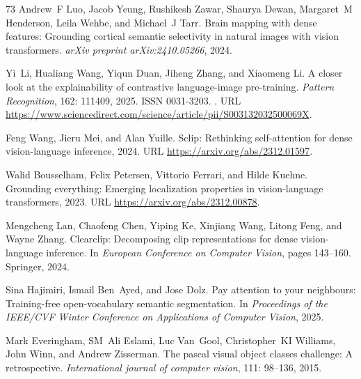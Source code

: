 \documentclass{article}
\begin{document}
\begin{thebibliography}{73}
Andrew~F Luo, Jacob Yeung, Rushikesh Zawar, Shaurya Dewan, Margaret~M
  Henderson, Leila Wehbe, and Michael~J Tarr.
\newblock Brain mapping with dense features: Grounding cortical semantic
  selectivity in natural images with vision transformers.
\newblock \emph{arXiv preprint arXiv:2410.05266}, 2024.

Yi~Li, Hualiang Wang, Yiqun Duan, Jiheng Zhang, and Xiaomeng Li.
\newblock A closer look at the explainability of contrastive language-image
  pre-training.
\newblock \emph{Pattern Recognition}, 162: 111409, 2025.
\newblock ISSN 0031-3203.
\newblock {}.
\newblock URL
  \url{https://www.sciencedirect.com/science/article/pii/S003132032500069X}.

Feng Wang, Jieru Mei, and Alan Yuille.
\newblock Sclip: Rethinking self-attention for dense vision-language inference,
  2024{}.
\newblock URL \url{https://arxiv.org/abs/2312.01597}.

Walid Bousselham, Felix Petersen, Vittorio Ferrari, and Hilde Kuehne.
\newblock Grounding everything: Emerging localization properties in
  vision-language transformers, 2023.
\newblock URL \url{https://arxiv.org/abs/2312.00878}.

Mengcheng Lan, Chaofeng Chen, Yiping Ke, Xinjiang Wang, Litong Feng, and Wayne
  Zhang.
\newblock Clearclip: Decomposing clip representations for dense vision-language
  inference.
\newblock In \emph{European Conference on Computer Vision}, pages 143--160.
  Springer, 2024.

Sina Hajimiri, Ismail Ben~Ayed, and Jose Dolz.
\newblock Pay attention to your neighbours: Training-free open-vocabulary
  semantic segmentation.
\newblock In \emph{Proceedings of the IEEE/CVF Winter Conference on
  Applications of Computer Vision}, 2025.

Mark Everingham, SM~Ali Eslami, Luc Van~Gool, Christopher~KI Williams, John
  Winn, and Andrew Zisserman.
\newblock The pascal visual object classes challenge: A retrospective.
\newblock \emph{International journal of computer vision}, 111:
  98--136, 2015.


\end{thebibliography}
\end{document}
